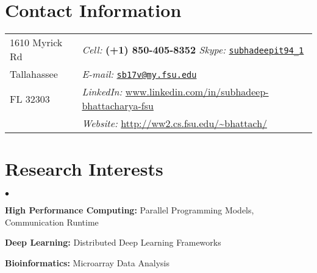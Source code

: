 \documentclass[margin,line]{res}
\newenvironment{list2}{
  \begin{list}{$\bullet$}{%
      \setlength{\itemsep}{0in}
      \setlength{\parsep}{0in} \setlength{\parskip}{0in}
      \setlength{\topsep}{0in} \setlength{\partopsep}{0in} 
      \setlength{\leftmargin}{0.2in}}}{\end{list}}
\begin{document}

\begin{resume}
\section{\sc Contact Information}
\begin{tabular}{@{}p{2in}p{4in}}
1610 Myrick Rd & {\it Cell:}  \textbf{(+1) 850-405-8352} {\it Skype:}    
\href{https://join.skype.com/invite/S9OC09imwnsO}{\nolinkurl{subhadeepit94\_1}}\\
            
Tallahassee & {\it E-mail:} 
\href{mailto:sb17v@my.fsu.edu}{\nolinkurl{sb17v@my.fsu.edu} } \\
FL 32303 & {\it 
LinkedIn:} \url{www.linkedin.com/in/subhadeep-bhattacharya-fsu}
 \\
 & {\it Website:} \url{http://ww2.cs.fsu.edu/~bhattach/} \\
\end{tabular}


\vspace*{-.18in}



\section{\sc Research Interests}
\begin{list2}
	\item \textbf{High Performance Computing:} Parallel Programming Models, 
	Communication Runtime
	\item \textbf{Deep Learning:} Distributed Deep Learning Frameworks
	\item \textbf{Bioinformatics:} Microarray Data Analysis
\end{list2}


\end{resume}
\end{document}
